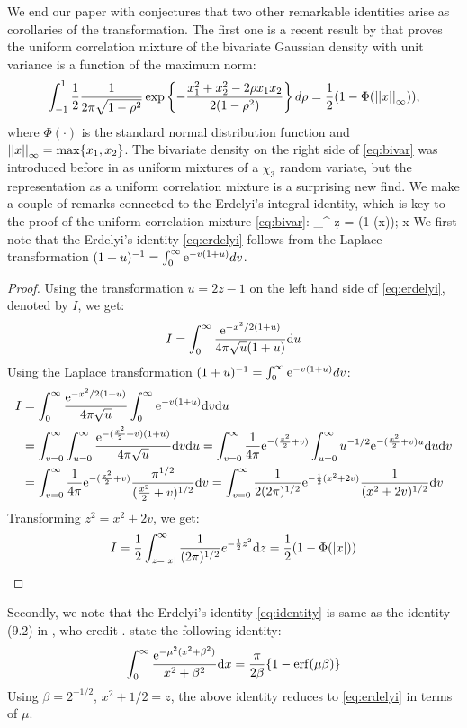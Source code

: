 \documentclass[letterpaper,11pt]{article}
\begin{document}
We end our paper with conjectures that two other remarkable identities arise as corollaries of the \CS transformation. The first one is a recent result by \cite{zhang2014uniform} that proves the uniform correlation mixture of the bivariate Gaussian density with unit variance is a function of the maximum norm: 
\begin{equation}
  \int_{-1}^{1} \frac{1}{2} \frac{1}{2\pi\sqrt{1-\rho^2}} \exp \left\{ - \frac{x_1^2 + x_2^2 - 2 \rho x_1 x_2}{2(1-\rho^2)} \right\} d \rho = 
  \frac{1}{2} (1- \Phi(\left|\left|x\right|\right|_{\infty})) \label{eq:bivar}, 
\end{equation}
where $\Phi(\cdot)$ is the standard normal distribution function and $\left|\left|x\right|\right|_{\infty} = \max \{ x_1, x_2\}$. The bivariate density on the right side of \eqref{eq:bivar} was introduced before in \cite{bryson1982constructing} as uniform mixtures of a $\chi_3$ random variate, but the representation as a uniform correlation mixture is a surprising new find. We make a couple of remarks connected to the Erdelyi's integral identity, which is key to the proof of the uniform correlation mixture \eqref{eq:bivar}: 
\beq
\int_{\half}^{\infty}  \d z = \half (1-\Phi(x)); x  \label{eq:erdelyi}
\eeq
We first note that the Erdelyi's identity \eqref{eq:erdelyi} follows from the Laplace transformation $(1+u)^{-1} = \int_0^{\infty} {\rm e}^{-v(1+u)} dv$. 
\begin{proof}
Using the transformation $ u = 2z-1$ on the left hand side of \eqref{eq:erdelyi}, denoted by $I$, we get: 
$$
I = \int_{0}^{\infty} \frac{{\rm e}^{-x^2/2(1+u)}}{4 \pi \sqrt{u} (1+u)} {\rm d} u
$$
Using the Laplace transformation $(1+u)^{-1} = \int_0^{\infty} {\rm e}^{-v(1+u)} dv$: 
\begin{align*}
I & = \int_{0}^{\infty} \frac{{\rm e}^{-x^2/2(1+u)}}{4 \pi \sqrt{u}} \int_0^{\infty} {\rm e}^{-v(1+u)} {\rm d} v {\rm d} u \\
& = \int_{v= 0}^{\infty} \int_{u=0}^{\infty} \frac{{\rm e}^{-(\frac{x^2}{2} + v)(1+u)}}{4 \pi \sqrt{u}} {\rm d} v {\rm d} u = \int_{v= 0}^{\infty} \frac{1}{4\pi} {\rm e}^{-(\frac{x^2}{2} + v)} \int_{u=0}^{\infty} u^{-1/2} {\rm e}^{-(\frac{x^2}{2} + v) u} {\rm d} u {\rm d} v \\
& = \int_{v= 0}^{\infty} \frac{1}{4\pi} {\rm e}^{-(\frac{x^2}{2} + v)} \frac{\pi^{1/2}}{(\frac{x^2}{2} + v)^{1/2}} {\rm d} v = \int_{v= 0}^{\infty} \frac{1}{2 (2\pi)^{1/2}} {\rm e}^{-\frac{1}{2}(x^2 + 2v)} \frac{1}{(x^2+ 2v)^{1/2}} {\rm d} v
\end{align*}
Transforming $z^2 = x^2 + 2v$, we get: 
$$
I =\frac{1}{2}  \int_{z = |x|}^{\infty} \frac{1}{(2\pi)^{1/2}} e^{-\frac{1}{2} z^2} {\rm d} z = \frac{1}{2} (1 - \Phi(|x|)) 
$$
\end{proof}
Secondly, we note that the Erdelyi's identity \eqref{eq:identity} is same as the identity (9.2) in \citep{amdeberhan2010cauchy}, who credit \citep{gradshteyn1980table}. \citet{amdeberhan2010cauchy} state the following identity: 
$$
\int_0^{\infty}\frac{{\rm e}^{-\mu^2(x^2+\beta^2)}}{x^2+\beta^2} {\rm d} x = \frac{\pi}{2 \beta} \{ 1 - {\rm erf}(\mu \beta) \} 
$$
Using $\beta = 2^{-1/2}$, $x^2+1/2 = z$, the above identity reduces to \eqref{eq:erdelyi} in terms of $\mu$. 
\end{document}
